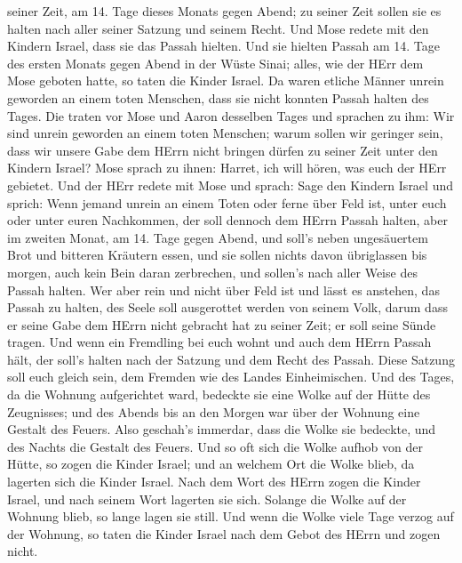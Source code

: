seiner Zeit,  am 14. Tage dieses Monats gegen Abend; zu
seiner Zeit sollen sie es halten nach aller seiner Satzung und seinem
Recht.  Und Mose redete mit den Kindern Israel, dass sie das
Passah hielten.  Und sie hielten Passah am 14. Tage des
ersten Monats gegen Abend in der Wüste Sinai; alles, wie der HErr dem
Mose geboten hatte, so taten die Kinder Israel.  Da waren
etliche Männer unrein geworden an einem toten Menschen, dass sie nicht
konnten Passah halten des Tages. Die traten vor Mose und Aaron desselben
Tages  und sprachen zu ihm: Wir sind unrein geworden an
einem toten Menschen; warum sollen wir geringer sein, dass wir unsere
Gabe dem HErrn nicht bringen dürfen zu seiner Zeit unter den Kindern
Israel?  Mose sprach zu ihnen: Harret, ich will hören, was
euch der HErr gebietet.  Und der HErr redete mit Mose und
sprach:  Sage den Kindern Israel und sprich: Wenn jemand
unrein an einem Toten oder ferne über Feld ist, unter euch oder unter
euren Nachkommen, der soll dennoch dem HErrn Passah halten,
 aber im zweiten Monat, am 14. Tage gegen Abend, und soll's
neben ungesäuertem Brot und bitteren Kräutern essen,  und
sie sollen nichts davon übriglassen bis morgen, auch kein Bein daran
zerbrechen, und sollen's nach aller Weise des Passah halten.
 Wer aber rein und nicht über Feld ist und lässt es
anstehen, das Passah zu halten, des Seele soll ausgerottet werden von
seinem Volk, darum dass er seine Gabe dem HErrn nicht gebracht hat zu
seiner Zeit; er soll seine Sünde tragen.  Und wenn ein
Fremdling bei euch wohnt und auch dem HErrn Passah hält, der soll's
halten nach der Satzung und dem Recht des Passah. Diese Satzung soll
euch gleich sein, dem Fremden wie des Landes Einheimischen.
 Und des Tages, da die Wohnung aufgerichtet ward, bedeckte
sie eine Wolke auf der Hütte des Zeugnisses; und des Abends bis an den
Morgen war über der Wohnung eine Gestalt des Feuers.  Also
geschah's immerdar, dass die Wolke sie bedeckte, und des Nachts die
Gestalt des Feuers.  Und so oft sich die Wolke aufhob von
der Hütte, so zogen die Kinder Israel; und an welchem Ort die Wolke
blieb, da lagerten sich die Kinder Israel.  Nach dem Wort
des HErrn zogen die Kinder Israel, und nach seinem Wort lagerten sie
sich. Solange die Wolke auf der Wohnung blieb, so lange lagen sie still.
 Und wenn die Wolke viele Tage verzog auf der Wohnung, so
taten die Kinder Israel nach dem Gebot des HErrn und zogen nicht.

